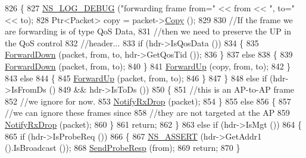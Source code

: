 \begin{DoxyCode}
826             \{
827               \hyperlink{group__logging_ga413f1886406d49f59a6a0a89b77b4d0a}{NS\_LOG\_DEBUG} (\textcolor{stringliteral}{"forwarding frame from="} << from << \textcolor{stringliteral}{", to="} << to);
828               Ptr<Packet> copy = packet->\hyperlink{classns3_1_1Packet_a5d5c70802a5f77fc5f0001e0cfc1898b}{Copy} ();
829 
830               \textcolor{comment}{//If the frame we are forwarding is of type QoS Data,}
831               \textcolor{comment}{//then we need to preserve the UP in the QoS control}
832               \textcolor{comment}{//header...}
833               \textcolor{keywordflow}{if} (hdr->IsQosData ())
834                 \{
835                   \hyperlink{classns3_1_1ApWifiMac_a407bd4754f3f401eb6c5b4a4fe622250}{ForwardDown} (packet, from, to, hdr->GetQosTid ());
836                 \}
837               \textcolor{keywordflow}{else}
838                 \{
839                   \hyperlink{classns3_1_1ApWifiMac_a407bd4754f3f401eb6c5b4a4fe622250}{ForwardDown} (packet, from, to);
840                 \}
841               \hyperlink{classns3_1_1RegularWifiMac_a34df292af97e69fefda8303cdb323d1d}{ForwardUp} (copy, from, to);
842             \}
843           \textcolor{keywordflow}{else}
844             \{
845               \hyperlink{classns3_1_1RegularWifiMac_a34df292af97e69fefda8303cdb323d1d}{ForwardUp} (packet, from, to);
846             \}
847         \}
848       \textcolor{keywordflow}{else} \textcolor{keywordflow}{if} (hdr->IsFromDs ()
849                && hdr->IsToDs ())
850         \{
851           \textcolor{comment}{//this is an AP-to-AP frame}
852           \textcolor{comment}{//we ignore for now.}
853           \hyperlink{classns3_1_1WifiMac_acc2ef3079b2a6ac4fb3838608e5e1ed4}{NotifyRxDrop} (packet);
854         \}
855       \textcolor{keywordflow}{else}
856         \{
857           \textcolor{comment}{//we can ignore these frames since}
858           \textcolor{comment}{//they are not targeted at the AP}
859           \hyperlink{classns3_1_1WifiMac_acc2ef3079b2a6ac4fb3838608e5e1ed4}{NotifyRxDrop} (packet);
860         \}
861       \textcolor{keywordflow}{return};
862     \}
863   \textcolor{keywordflow}{else} \textcolor{keywordflow}{if} (hdr->IsMgt ())
864     \{
865       \textcolor{keywordflow}{if} (hdr->IsProbeReq ())
866         \{
867           \hyperlink{assert_8h_a6dccdb0de9b252f60088ce281c49d052}{NS\_ASSERT} (hdr->GetAddr1 ().IsBroadcast ());
868           \hyperlink{classns3_1_1ApWifiMac_a0a9fcbd87326c5c56644deb3504038df}{SendProbeResp} (from);
869           \textcolor{keywordflow}{return};
870         \}

\end{DoxyCode}
